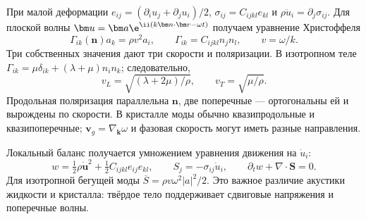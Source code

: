 
При малой деформации $e_{ij}=(\partial_i u_j+\partial_j u_i)/2$, $\sigma_{ij}=C_{ijkl}e_{kl}$ и $\rho\ddot u_i=\partial_j\sigma_{ij}$. Для плоской волны $\bm u=\bm a\e^{\ii(k\bm n\cdot\bm r-\omega t)}$ получаем уравнение Христоффеля
\begin{equation}
 \Gamma_{ik}(\bm n)a_k=\rho v^2a_i,\qquad
 \Gamma_{ik}=C_{ijkl}n_jn_l,\qquad v=\omega/k.
\end{equation}
Три собственных значения дают три скорости и поляризации. В изотропном теле
$\Gamma_{ik}=\mu\delta_{ik}+(\lambda+\mu)n_in_k$; следовательно,
\begin{equation}
 v_L=\sqrt{(\lambda+2\mu)/\rho},\qquad v_T=\sqrt{\mu/\rho}.
\end{equation}
Продольная поляризация параллельна $\bm n$, две поперечные — ортогональны ей и вырождены по скорости. В кристалле моды обычно квазипродольные и квазипоперечные; $\bm v_g=\nabla_{\bm k}\omega$ и фазовая скорость могут иметь разные направления.

Локальный баланс получается умножением уравнения движения на $\dot u_i$:
\begin{equation}
 w=\tfrac12\rho\dot{\bm u}^2+\tfrac12 C_{ijkl}e_{ij}e_{kl},\qquad
 S_j=-\sigma_{ij}\dot u_i,\qquad \partial_tw+\nabla\cdot\bm S=0.
\end{equation}
Для изотропной бегущей моды $\overline S=\rho v\omega^2|a|^2/2$. Это важное различие акустики жидкости и кристалла: твёрдое тело поддерживает сдвиговые напряжения и поперечные волны.
